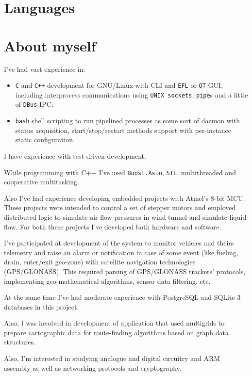 \documentclass[11pt,a4paper,russian]{moderncv}
\begin{document}
\section{Languages}

\section{About myself}
\par{I've had vast experience in:}
\begin{itemize}
\item \texttt{C} and \texttt{C++} development for GNU/Linux with CLI and \texttt{EFL} or \texttt{QT} GUI, including interprocess communications using \texttt{UNIX sockets}, \texttt{pipe}s and a little of \texttt{DBus} IPC;
\item \texttt{bash} shell scripting to run pipelined processes as some sort of daemon with status acquisition, start/stop/restart methods support with per-instance static configuration.
\end{itemize}
\par{I have experience with test-driven development.}
\par{While programming with C++ I've used \texttt{Boost.Asio}, \texttt{STL}, multithreaded and cooperative multitasking.}
\par{Also I've had experience developing embedded projects with Atmel's 8-bit MCU. These projects were intended to control a set of stepper motors and employed distributed logic to simulate air flow pressures in wind tunnel and simulate liquid flow. For both these projects I've developed both hardware and software.}
\par{I've participated at development of the system to monitor vehicles and theirs telemetry and raise an alarm or notification in case of some event (like fueling, drain, enter/exit geo-zone) with satellite navigation technologies (GPS/GLONASS). This required parsing of GPS/GLONASS trackers' protocols, implementing geo-mathematical algorithms, sensor data filtering, etc.}
\par{At the same time I've had moderate experience with PostgreSQL and SQLite 3 databases in this project.}
\par{Also, I was involved in development of application that used multigrids to prepare cartographic data for route-finding algorithms based on graph data structures.}
\par{Also, I'm interested in studying analogue and digital circuitry and ARM assembly as well as networking protocols and cryptography.}
\end{document}
